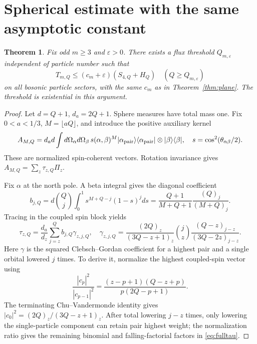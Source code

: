 \documentclass[11pt]{article}
\newtheorem{theorem}{Theorem}
\newcommand{\fall}[2]{(#1)_{#2}}
\begin{document}
\section{Spherical estimate with the same asymptotic constant}
\begin{theorem}\label{thm:sphere}
Fix odd $m\ge3$ and $\varepsilon>0$. There exists a flux threshold
$Q_{m,\varepsilon}$ independent of particle number such that
\begin{equation}\label{eq:spherebound}
 T_{m,Q}\le(c_m+\varepsilon)(S_{4,Q}+H_Q)
 \quad(Q\ge Q_{m,\varepsilon})
\end{equation}
on all bosonic particle sectors, with the same $c_m$ as in
Theorem~\ref{thm:plane}. The threshold is existential in this argument.
\end{theorem}
\begin{proof}
Let $d=Q+1$, $d_a=2Q+1$. Sphere measures have total mass one. Fix
$0<a<1/3$, $M=\lfloor aQ\rfloor$, and introduce the positive auxiliary kernel
\begin{equation}
 A_{M,Q}=d_ad\int d\Omega_\alpha d\Omega_\beta\,
 s(\alpha,\beta)^M
 |\alpha_{\rm pair}\rangle\langle\alpha_{\rm pair}|
 \otimes|\beta\rangle\langle\beta|,
 \quad s=\cos^2(\theta_{\alpha\beta}/2).
\end{equation}
These are normalized spin-coherent vectors. Rotation invariance gives
$A_{M,Q}=\sum_z\tau_{z,Q}\Pi_z$.

Fix $\alpha$ at the north pole. A beta integral gives the diagonal coefficient
\begin{equation}
 b_{j,Q}=d\binom Qj\int_0^1s^{M+Q-j}(1-s)^j ds
 =\frac{Q+1}{M+Q+1}\frac{\fall Qj}{\fall{M+Q}j}.
\end{equation}
Tracing in the coupled spin block yields
\begin{equation}\label{eq:fulltau}
 \tau_{z,Q}=\frac{d_a}{d_z}\sum_{j=z}^Q b_{j,Q}\gamma_{z,j,Q},\quad
 \gamma_{z,j,Q}=
 \frac{\fall{2Q}z}{\fall{3Q-z+1}z}
 \binom jz\frac{\fall{Q-z}{j-z}}{\fall{3Q-2z}{j-z}}.
\end{equation}
Here $\gamma$ is the squared Clebsch--Gordan coefficient for a highest pair
and a single orbital lowered $j$ times. To derive it, normalize the highest
coupled-spin vector using
\begin{equation}
 \frac{|c_p|^2}{|c_{p-1}|^2}
 =\frac{(z-p+1)(Q-z+p)}{p(2Q-p+1)}.
\end{equation}
The terminating Chu--Vandermonde identity gives
$|c_0|^2=\fall{2Q}z/\fall{3Q-z+1}z$. After total lowering $j-z$ times,
only lowering the single-particle component can retain pair highest weight;
the normalization ratio gives the remaining binomial and falling-factorial
factors in \eqref{eq:fulltau}.


\end{proof}
\end{document}

